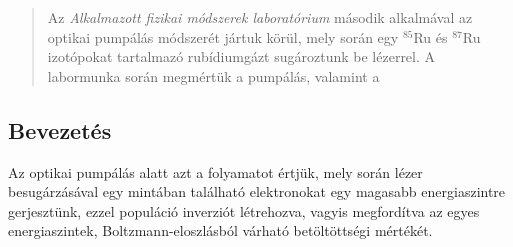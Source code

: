 \begin{abstract}
    \noindent Az \emph{Alkalmazott fizikai módszerek laboratórium} második alkalmával az optikai pumpálás módszerét jártuk körül, mely során egy $^{85}$Ru és $^{87}$Ru izotópokat tartalmazó rubídiumgázt sugároztunk be lézerrel. A labormunka során megmértük a pumpálás, valamint a 
\end{abstract}

\begin{multicols}{2}
\section{Bevezetés}
Az optikai pumpálás alatt azt a folyamatot értjük, mely során lézer besugárzásával egy mintában található elektronokat egy magasabb energiaszintre gerjesztünk, ezzel populáció inverziót létrehozva, vagyis megfordítva az egyes energiaszintek, Boltzmann-eloszlásból várható betöltöttségi mértékét.


\end{multicols}